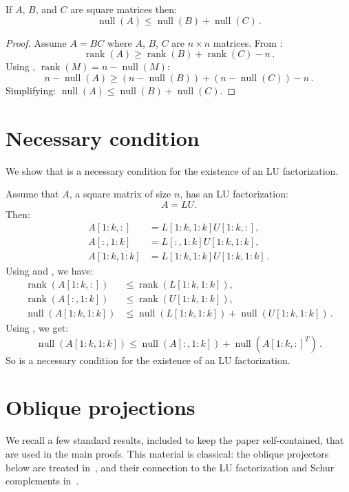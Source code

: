 \documentclass[10pt,twoside]{siamart1116}
\DeclareMathOperator{\rk}{rank}
\DeclareMathOperator{\nl}{null}
\numberwithin{theorem}{section}
\begin{document}
\begin{corollary}\label{cor:nullity}
  If $A$, $B$, and $C$ are square matrices then:
  \[
    \nl(A) \le \nl(B) + \nl(C) \,.
  \]
\end{corollary}

\begin{proof}
  Assume $A = BC$ where $A$, $B$, $C$ are $n \times n$ matrices. From :
  \[ \rk(A) \ge \rk(B) + \rk(C) - n \,. \]
  Using , $\rk(M) = n - \nl(M)$:
  \[ n - \nl(A) \ge (n - \nl(B)) + (n - \nl(C)) - n \,. \]
  Simplifying: $\nl(A) \le \nl(B) + \nl(C)$.
\end{proof}

\section{Necessary condition} \label{sec:necessary}

We show that  is a necessary condition for the existence of an LU factorization.

Assume that $A$, a square matrix of size $n$, has an LU factorization:
\[ A = LU. \]
Then:
\begin{align*}
  A[1:k,:]   & = L[1:k,1:k] U[1:k,:], \\
  A[:,1:k]   & = L[:,1:k] U[1:k,1:k], \\
  A[1:k,1:k] & = L[1:k,1:k] U[1:k,1:k] \,.
\end{align*}
Using  and , we have:
\begin{align*}
  \rk(A[1:k,:])   & \le \rk(L[1:k,1:k]), \\
  \rk(A[:,1:k])   & \le \rk(U[1:k,1:k]), \\
  \nl(A[1:k,1:k]) & \le \nl(L[1:k,1:k]) + \nl(U[1:k,1:k]) \,.
\end{align*}
Using , we get:
\[
  \nl(A[1:k,1:k]) \le \nl(A[:,1:k]) + \nl({A[1:k,:]}^T) \,.
\]
So  is a necessary condition for the existence of an LU factorization.

\section{Oblique projections}\label{sec:appendix}

We recall a few standard results, included to keep the paper self-contained, that are used in the main proofs. This material is classical: the oblique projectors below are treated in~\cite{Stewart_2011,Kayalar_1989}, and their connection to the LU factorization and Schur complements in~\cite{Cottle_1974,Ouellette_1981,Zhang_2006,Householder_2013}.
\end{document}
